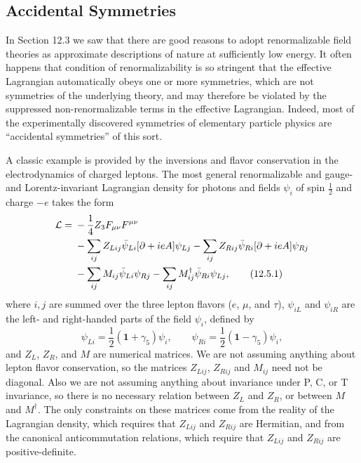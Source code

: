 
\subsection[Accidental Symmetries]{Accidental Symmetries\texorpdfstring{\protect\footnotemark}{}}

In Section 12.3 we saw that there are good reasons to adopt renormalizable
field theories as approximate descriptions of nature at sufficiently low
energy. It often happens that condition of renormalizability is so stringent
that the effective Lagrangian automatically obeys one or more symmetries,
which are not symmetries of the underlying theory, and may therefore be
violated by the suppressed non-renormalizable terms in the effective
Lagrangian. Indeed, most of the experimentally discovered symmetries of
elementary particle physics are \textquotedblleft accidental
symmetries\textquotedblright{} of this sort.

A classic example is provided by the inversions and flavor conservation in the
electrodynamics of charged leptons. The most general renormalizable and gauge-
and Lorentz-invariant Lagrangian density for photons and fields $\psi_i$ of
spin $\tfrac12$ and charge $-e$ takes the form
\begin{align}
\mathcal L={}&-\frac14 Z_3F_{\mu\nu}F^{\mu\nu}\notag\\
&-\sum_{ij}Z_{Lij}\bar\psi_{Li}[\sl{\partial}+ie\sl A]\psi_{Lj}
-\sum_{ij}Z_{Rij}\bar\psi_{Ri}[\sl{\partial}+ie\sl A]\psi_{Rj}\notag\\
&-\sum_{ij}M_{ij}\bar\psi_{Li}\psi_{Rj}
-\sum_{ij}M_{ij}^{\dagger}\bar\psi_{Ri}\psi_{Lj},
\tag{12.5.1}\label{eq:12.5.1}
\end{align}
where $i,j$ are summed over the three lepton flavors ($e$, $\mu$, and $\tau$),
$\psi_{iL}$ and $\psi_{iR}$ are the left- and right-handed parts of the field
$\psi_i$, defined by
\begin{equation}
\psi_{Li}=\frac12(\mathbf{1}+\gamma_5)\psi_i,
\qquad
\psi_{Ri}=\frac12(\mathbf{1}-\gamma_5)\psi_i,
\tag{12.5.2}\label{eq:12.5.2}
\end{equation}
and $Z_L$, $Z_R$, and $M$ are numerical matrices. We are not assuming
anything about lepton flavor conservation, so the matrices $Z_{Lij}$,
$Z_{Rij}$ and $M_{ij}$ need not be diagonal. Also we are not assuming
anything about invariance under P, C, or T invariance, so there is no necessary
relation between $Z_L$ and $Z_R$, or between $M$ and $M^\dagger$. The only
constraints on these matrices come from the reality of the Lagrangian density,
which requires that $Z_{Lij}$ and $Z_{Rij}$ are Hermitian, and from the
canonical anticommutation relations, which require that $Z_{Lij}$ and
$Z_{Rij}$ are positive-definite.

